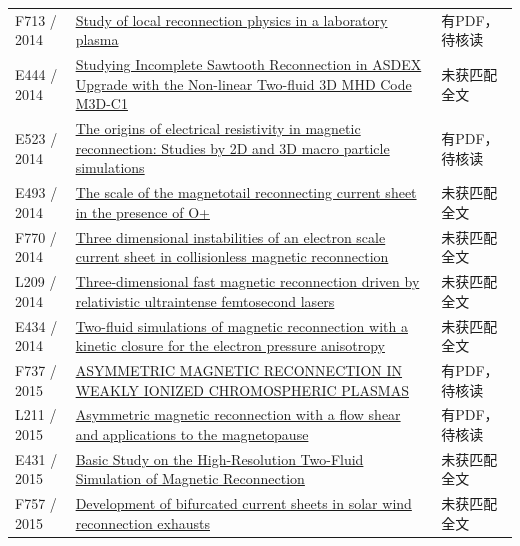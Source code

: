 \documentclass[UTF8,a4paper,11pt,openany,fontset=fandol]{ctexbook}
\begin{document}
\begin{longtable}{P{24mm}P{97mm}P{27mm}}
F713 / 2014 & \href{https://doi.org/10.1186/bf03353267}{Study of local reconnection physics in a laboratory plasma} & 有PDF，待核读\\

E444 / 2014 & \href{http://citeseerx.ist.psu.edu/viewdoc/summary?doi=10.1.1.717.5563}{Studying Incomplete Sawtooth Reconnection in ASDEX Upgrade with the Non-linear Two-fluid 3D MHD Code M3D-C1} & 未获匹配全文\\

E523 / 2014 & \href{https://doi.org/10.1186/bf03353257}{The origins of electrical resistivity in magnetic reconnection: Studies by 2D and 3D macro particle simulations} & 有PDF，待核读\\

E493 / 2014 & \href{https://doi.org/10.1002/2014gl060440}{The scale of the magnetotail reconnecting current sheet in the presence of O+} & 未获匹配全文\\

F770 / 2014 & \href{https://doi.org/10.1063/1.4885636}{Three dimensional instabilities of an electron scale current sheet in collisionless magnetic reconnection} & 未获匹配全文\\

L209 / 2014 & \href{https://doi.org/10.1103/physreve.89.031101}{Three-dimensional fast magnetic reconnection driven by relativistic ultraintense femtosecond lasers} & 未获匹配全文\\

E434 / 2014 & \href{http://hdl.handle.net/1721.1/95854}{Two-fluid simulations of magnetic reconnection with a kinetic closure for the electron pressure anisotropy} & 未获匹配全文\\

F737 / 2015 & \href{https://doi.org/10.1088/0004-637x/805/2/134}{ASYMMETRIC MAGNETIC RECONNECTION IN WEAKLY IONIZED CHROMOSPHERIC PLASMAS} & 有PDF，待核读\\

L211 / 2015 & \href{https://doi.org/10.1002/2015ja021489}{Asymmetric magnetic reconnection with a flow shear and applications to the magnetopause} & 有PDF，待核读\\

E431 / 2015 & \href{https://nifs-repository.repo.nii.ac.jp/records/7192}{Basic Study on the High-Resolution Two-Fluid Simulation of Magnetic Reconnection} & 未获匹配全文\\

F757 / 2015 & \href{https://doi.org/10.1002/2015gl066820}{Development of bifurcated current sheets in solar wind reconnection exhausts} & 未获匹配全文\\


\end{longtable}
\end{document}
